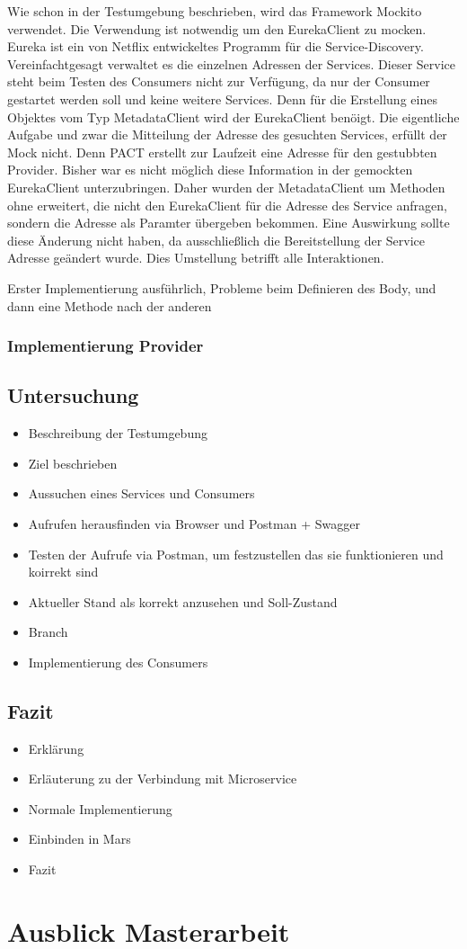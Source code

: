\documentclass{llncs}
\begin{document}
Wie schon in der Testumgebung beschrieben, wird das Framework Mockito verwendet. Die Verwendung ist notwendig um den EurekaClient zu mocken. Eureka ist ein von Netflix entwickeltes Programm für die Service-Discovery. Vereinfachtgesagt verwaltet es die einzelnen Adressen der Services. Dieser Service steht beim Testen des Consumers nicht zur Verfügung, da nur der Consumer gestartet werden soll und keine weitere Services. Denn für die Erstellung eines Objektes vom Typ MetadataClient wird der EurekaClient benöigt. Die eigentliche Aufgabe und zwar die Mitteilung der Adresse des gesuchten Services, erfüllt der Mock nicht. Denn PACT erstellt zur Laufzeit eine Adresse für den gestubbten Provider. Bisher war es nicht möglich diese Information in der gemockten EurekaClient unterzubringen. Daher wurden der MetadataClient um Methoden ohne erweitert, die nicht den EurekaClient für die Adresse des Service anfragen, sondern die Adresse als Paramter übergeben bekommen. Eine Auswirkung sollte diese Änderung nicht haben, da ausschließlich die Bereitstellung der Service Adresse geändert wurde. Dies Umstellung betrifft alle Interaktionen.



Erster Implementierung ausführlich, Probleme beim Definieren des Body, und dann eine Methode nach der anderen

\subsubsection{Implementierung Provider}

\subsection{Untersuchung}


\begin{itemize}
\item Beschreibung der Testumgebung
\item Ziel beschrieben
\item Aussuchen eines Services und Consumers
\item Aufrufen herausfinden via Browser und Postman + Swagger
\item Testen der Aufrufe via Postman, um festzustellen das sie funktionieren und koirrekt sind
\item Aktueller Stand als korrekt anzusehen und Soll-Zustand
\item Branch
\item Implementierung des Consumers
\end{itemize}

\subsection{Fazit}
\begin{itemize}
\item Erklärung
\item Erläuterung zu der Verbindung mit Microservice
\item Normale Implementierung
\item Einbinden in Mars
\item Fazit
\end{itemize}
\section{Ausblick Masterarbeit}





\end{document}
